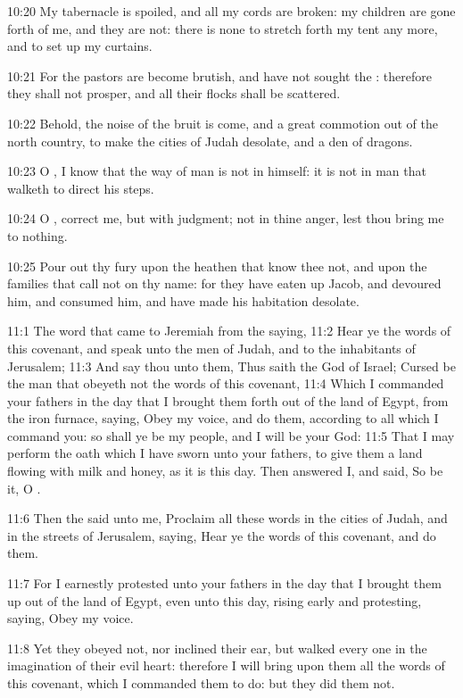 10:20 My tabernacle is spoiled, and all my cords are broken: my
children are gone forth of me, and they are not: there is none to
stretch forth my tent any more, and to set up my curtains.

10:21 For the pastors are become brutish, and have not sought the
\LORD: therefore they shall not prosper, and all their flocks shall be
scattered.

10:22 Behold, the noise of the bruit is come, and a great commotion
out of the north country, to make the cities of Judah desolate, and a
den of dragons.

10:23 O \LORD, I know that the way of man is not in himself: it is not
in man that walketh to direct his steps.

10:24 O \LORD, correct me, but with judgment; not in thine anger, lest
thou bring me to nothing.

10:25 Pour out thy fury upon the heathen that know thee not, and upon
the families that call not on thy name: for they have eaten up Jacob,
and devoured him, and consumed him, and have made his habitation
desolate.

11:1 The word that came to Jeremiah from the \LORD saying, 11:2 Hear ye
the words of this covenant, and speak unto the men of Judah, and to
the inhabitants of Jerusalem; 11:3 And say thou unto them, Thus saith
the \LORD God of Israel; Cursed be the man that obeyeth not the words
of this covenant, 11:4 Which I commanded your fathers in the day that
I brought them forth out of the land of Egypt, from the iron furnace,
saying, Obey my voice, and do them, according to all which I command
you: so shall ye be my people, and I will be your God: 11:5 That I may
perform the oath which I have sworn unto your fathers, to give them a
land flowing with milk and honey, as it is this day. Then answered I,
and said, So be it, O \LORD.

11:6 Then the \LORD said unto me, Proclaim all these words in the
cities of Judah, and in the streets of Jerusalem, saying, Hear ye the
words of this covenant, and do them.

11:7 For I earnestly protested unto your fathers in the day that I
brought them up out of the land of Egypt, even unto this day, rising
early and protesting, saying, Obey my voice.

11:8 Yet they obeyed not, nor inclined their ear, but walked every one
in the imagination of their evil heart: therefore I will bring upon
them all the words of this covenant, which I commanded them to do: but
they did them not.

